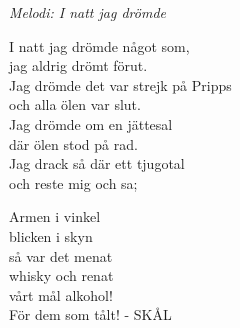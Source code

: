 {\footnotesize\textit{Melodi: I natt jag drömde}}\par
\vspace{10pt}
I natt jag drömde något som,\\
jag aldrig drömt förut.\\
Jag drömde det var strejk på Pripps\\
och alla ölen var slut.\\
Jag drömde om en jättesal\\
där ölen stod på rad.\\
Jag drack så där ett tjugotal\\
och reste mig och sa;\par
\vspace{10pt}
Armen i vinkel\\
blicken i skyn\\
så var det menat\\
whisky och renat\\
vårt mål alkohol!\\
För dem som tålt! - SKÅL
